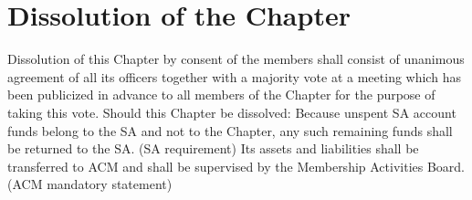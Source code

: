 \documentclass{article}
\begin{document}
\section{Dissolution of the Chapter}
Dissolution of this Chapter by consent of the members shall consist of unanimous agreement of all its officers together with a majority vote at a meeting which has been publicized in advance to all members of the Chapter for the purpose of taking this vote.
Should this Chapter be dissolved:
Because unspent SA account funds belong to the SA and not to the Chapter, any such remaining funds shall be returned to the SA. (SA requirement)
Its assets and liabilities shall be transferred to ACM and shall be supervised by the Membership Activities Board. (ACM mandatory statement)
\end{document}
